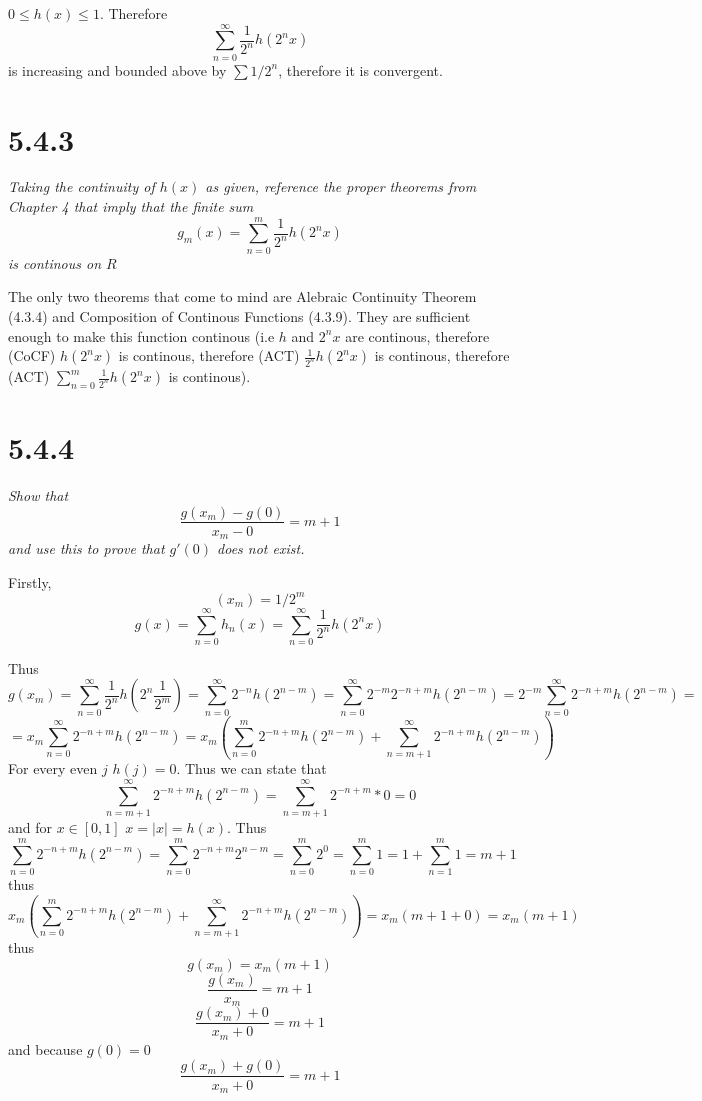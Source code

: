 \documentclass[11pt,oneside,titlepage]{book}
\begin{document}
$0 \leq h(x) \leq 1$. Therefore
$$\sum_{n = 0}^{\infty}{\frac{1}{2^n}h(2^nx)}$$
is increasing and bounded above by $\sum{1/2^n}$, therefore it is convergent.

\section*{5.4.3}
\textit{Taking the continuity of $h(x)$ as given, reference the proper
  theorems from Chapter 4 that imply that the finite sum}
$$g_m(x) = \sum_{n = 0}^{m}{\frac{1}{2^n} h (2^nx)}$$
\textit{is continous on $R$}

The only two theorems that come to mind are Alebraic Continuity Theorem (4.3.4)
and Composition of Continous Functions (4.3.9).
They are sufficient enough to make this function continous
(i.e $h$ and $2^nx$ are continous, therefore (CoCF) $h(2^nx)$ is continous,
therefore (ACT) $\frac{1}{2^n} h(2^nx)$ is continous, therefore (ACT)
$\sum_{n = 0}^{m} \frac{1}{2^n} h(2^nx)$ is continous).


\section*{5.4.4}
\textit{Show that}
$$\frac{g(x_m) - g(0)}{x_m - 0} = m + 1$$
\textit{and use this to prove that $g'(0)$ does not exist.}

Firstly,
$$(x_m) = 1/2^m$$
$$g(x) = \sum_{n = 0}^{\infty}{h_n(x)} =
\sum_{n = 0}^{\infty}{\frac{1}{2^n}h(2^nx)}$$

Thus
$$g(x_m) = \sum_{n = 0}^{\infty}{\frac{1}{2^n}h(2^n \frac{1}{2^m})} = 
\sum_{n = 0}^{\infty}{2^{-n}h(2^{n - m})} =
\sum_{n = 0}^{\infty}{2^{-m}2^{-n + m} h(2^{n - m})} =
2^{-m} \sum_{n = 0}^{\infty}{2^{-n + m} h(2^{n - m})} = $$
$$
= x_m \sum_{n = 0}^{\infty}{2^{-n + m} h(2^{n - m})}
= x_m \left(\sum_{n = 0}^{m}{2^{-n + m} h(2^{n - m})} + 
\sum_{n = m + 1}^{\infty}{2^{-n + m} h(2^{n - m})}\right)
$$
For every even $j$ $h(j) = 0$. Thus we can state that
$$\sum_{n = m + 1}^{\infty}{2^{-n + m} h(2^{n - m})} =
\sum_{n = m + 1}^{\infty}{2^{-n + m} * 0 } = 0
$$
and for $x \in [0, 1]$ $x = |x| = h(x)$. Thus
$$\sum_{n = 0}^{m}{2^{-n + m} h(2^{n - m})} =
\sum_{n = 0}^{m}{2^{-n + m} 2^{n - m}} =
\sum_{n = 0}^{m}{2^0} =
\sum_{n = 0}^{m}{1} =
1 + \sum_{n = 1}^{m}{1} =
m + 1
$$
thus
$$
x_m \left(\sum_{n = 0}^{m}{2^{-n + m} h(2^{n - m})} + 
  \sum_{n = m + 1}^{\infty}{2^{-n + m} h(2^{n - m})}\right) =
x_m \left(m + 1 + 0\right) =
x_m \left(m + 1\right)
$$
thus
$$g(x_m) = x_m(m + 1)$$
$$\frac{g(x_m)}{x_m} = m + 1$$
$$\frac{g(x_m) + 0}{x_m + 0} = m + 1$$
and because $g(0) = 0$
$$\frac{g(x_m) + g(0)}{x_m + 0} = m + 1$$
\end{document}
